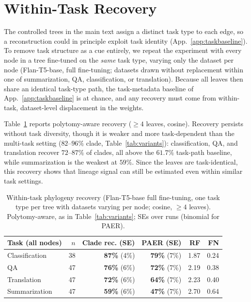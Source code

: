 \documentclass{article}
\theoremstyle{definition}
\theoremstyle{plain}
\begin{document}
\section{Within-Task Recovery}
\label{app:withintask}

The controlled trees in the main text assign a distinct task type to each edge, so a reconstruction
could in principle exploit task identity (App.~\ref{app:taskbaseline}). To remove task structure as a
cue entirely, we repeat the experiment with every node in a tree fine-tuned on the \emph{same} task
type, varying only the dataset per node (Flan-T5-base, full fine-tuning; datasets drawn without
replacement within one of summarization, QA, classification, or translation). Because all leaves then
share an identical task-type path, the task-metadata baseline of App.~\ref{app:taskbaseline} is at
chance, and any recovery must come from within-task, dataset-level displacement in the weights.

Table~\ref{tab:withintask} reports polytomy-aware recovery ($\geq 4$ leaves, cosine). Recovery persists
without task diversity, though it is weaker and more task-dependent than the multi-task setting
($82$--$96\%$ clade, Table~\ref{tab:variants}): classification, QA, and translation recover $72$--$87\%$
of clades, all above the $61.7\%$ task-path baseline, while summarization is the weakest at $59\%$.
Since the leaves are task-identical, this recovery shows that lineage signal can still be estimated even within similar task settings.

\begin{table}[h]
\caption{Within-task phylogeny recovery (Flan-T5-base full fine-tuning, one task type per tree with
  datasets varying per node; cosine, $\geq 4$ leaves). Polytomy-aware, as in
  Table~\ref{tab:variants}; SEs over runs (binomial for PAER).}
\label{tab:withintask}
\centering
\small
\begin{tabular}{lrrrrr}
\toprule
Task (all nodes) & $n$ & Clade rec. (SE) & PAER (SE) & RF & FN \\
\midrule
Classification & 38 & \textbf{87\%} (4\%) & \textbf{79\%} (7\%) & 1.87 & 0.24 \\
QA             & 47 & \textbf{76\%} (6\%) & \textbf{72\%} (7\%) & 2.19 & 0.38 \\
Translation    & 47 & \textbf{72\%} (6\%) & \textbf{64\%} (7\%) & 2.23 & 0.40 \\
Summarization  & 47 & \textbf{59\%} (6\%) & \textbf{47\%} (7\%) & 2.70 & 0.64 \\
\bottomrule
\end{tabular}
\end{table}
\end{document}
